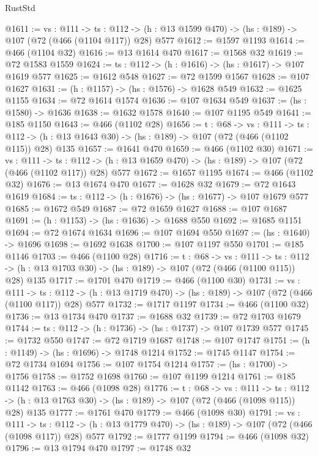 \begin{lexlean}{RustStd}
\begin{coremodule}
{\begin{coremodule}
{{{{@1611 := {vs : @111} ->
  {ts : @112} -> (h : @13 @1599 @470) -> (hs : @189) -> @107 (@72 (@466 (@1104 @117)) @28) @577
@1612 := @1597 @1193
@1614 := @466 (@1104 @32)
@1616 := @13 @1614 @470
@1617 := @1568 @32
@1619 := @72 @1583 @1559
@1624 := {ts : @112} -> (h : @1616) -> (hs : @1617) -> @107 @1619 @577
@1625 := @1612 @548
@1627 := @72 @1599 @1567
@1628 := @107 @1627
@1631 := (h : @1157) -> (hs : @1576) -> @1628 @549
@1632 := @1625 @1155
@1634 := @72 @1614 @1574
@1636 := @107 @1634 @549
@1637 := (hs : @1580) -> @1636
@1638 := @1632 @1578
@1640 := @107 @1195 @549
@1641 := @185 @1150
@1643 := @466 (@1102 @28)
@1656 := {t : @68} ->
  {vs : @111} ->
  {ts : @112} -> (h : @13 @1643 @30) -> (hs : @189) -> @107 (@72 (@466 (@1102 @115)) @28) @135
@1657 := @1641 @470
@1659 := @466 (@1102 @30)
@1671 := {vs : @111} ->
  {ts : @112} -> (h : @13 @1659 @470) -> (hs : @189) -> @107 (@72 (@466 (@1102 @117)) @28) @577
@1672 := @1657 @1195
@1674 := @466 (@1102 @32)
@1676 := @13 @1674 @470
@1677 := @1628 @32
@1679 := @72 @1643 @1619
@1684 := {ts : @112} -> (h : @1676) -> (hs : @1677) -> @107 @1679 @577
@1685 := @1672 @549
@1687 := @72 @1659 @1627
@1688 := @107 @1687
@1691 := (h : @1153) -> (hs : @1636) -> @1688 @550
@1692 := @1685 @1151
@1694 := @72 @1674 @1634
@1696 := @107 @1694 @550
@1697 := (hs : @1640) -> @1696
@1698 := @1692 @1638
@1700 := @107 @1197 @550
@1701 := @185 @1146
@1703 := @466 (@1100 @28)
@1716 := {t : @68} ->
  {vs : @111} ->
  {ts : @112} -> (h : @13 @1703 @30) -> (hs : @189) -> @107 (@72 (@466 (@1100 @115)) @28) @135
@1717 := @1701 @470
@1719 := @466 (@1100 @30)
@1731 := {vs : @111} ->
  {ts : @112} -> (h : @13 @1719 @470) -> (hs : @189) -> @107 (@72 (@466 (@1100 @117)) @28) @577
@1732 := @1717 @1197
@1734 := @466 (@1100 @32)
@1736 := @13 @1734 @470
@1737 := @1688 @32
@1739 := @72 @1703 @1679
@1744 := {ts : @112} -> (h : @1736) -> (hs : @1737) -> @107 @1739 @577
@1745 := @1732 @550
@1747 := @72 @1719 @1687
@1748 := @107 @1747
@1751 := (h : @1149) -> (hs : @1696) -> @1748 @1214
@1752 := @1745 @1147
@1754 := @72 @1734 @1694
@1756 := @107 @1754 @1214
@1757 := (hs : @1700) -> @1756
@1758 := @1752 @1698
@1760 := @107 @1199 @1214
@1761 := @185 @1142
@1763 := @466 (@1098 @28)
@1776 := {t : @68} ->
  {vs : @111} ->
  {ts : @112} -> (h : @13 @1763 @30) -> (hs : @189) -> @107 (@72 (@466 (@1098 @115)) @28) @135
@1777 := @1761 @470
@1779 := @466 (@1098 @30)
@1791 := {vs : @111} ->
  {ts : @112} -> (h : @13 @1779 @470) -> (hs : @189) -> @107 (@72 (@466 (@1098 @117)) @28) @577
@1792 := @1777 @1199
@1794 := @466 (@1098 @32)
@1796 := @13 @1794 @470
@1797 := @1748 @32
}}}}
\end{coremodule}}
\end{coremodule}
\end{lexlean}
